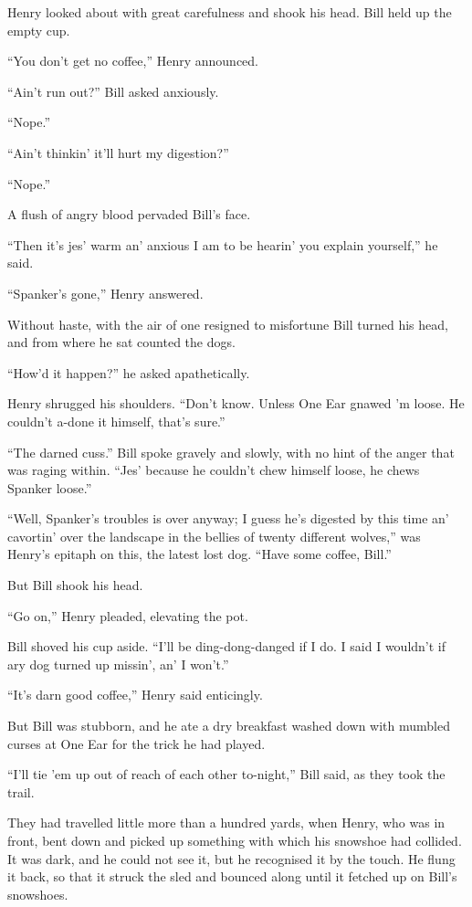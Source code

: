 \documentclass[10pt]{book}
\begin{document}
Henry looked about with great carefulness and shook his head. Bill held
up the empty cup.

“You don’t get no coffee,” Henry announced.

“Ain’t run out?” Bill asked anxiously.

“Nope.”

“Ain’t thinkin’ it’ll hurt my digestion?”

“Nope.”

A flush of angry blood pervaded Bill’s face.

“Then it’s jes’ warm an’ anxious I am to be hearin’ you explain
yourself,” he said.

“Spanker’s gone,” Henry answered.

Without haste, with the air of one resigned to misfortune Bill turned
his head, and from where he sat counted the dogs.

“How’d it happen?” he asked apathetically.

Henry shrugged his shoulders. “Don’t know. Unless One Ear gnawed ’m
loose. He couldn’t a-done it himself, that’s sure.”

“The darned cuss.” Bill spoke gravely and slowly, with no hint of the
anger that was raging within. “Jes’ because he couldn’t chew himself
loose, he chews Spanker loose.”

“Well, Spanker’s troubles is over anyway; I guess he’s digested by this
time an’ cavortin’ over the landscape in the bellies of twenty
different wolves,” was Henry’s epitaph on this, the latest lost dog.
“Have some coffee, Bill.”

But Bill shook his head.

“Go on,” Henry pleaded, elevating the pot.

Bill shoved his cup aside. “I’ll be ding-dong-danged if I do. I said I
wouldn’t if ary dog turned up missin’, an’ I won’t.”

“It’s darn good coffee,” Henry said enticingly.

But Bill was stubborn, and he ate a dry breakfast washed down with
mumbled curses at One Ear for the trick he had played.

“I’ll tie ’em up out of reach of each other to-night,” Bill said, as
they took the trail.

They had travelled little more than a hundred yards, when Henry, who
was in front, bent down and picked up something with which his snowshoe
had collided. It was dark, and he could not see it, but he recognised
it by the touch. He flung it back, so that it struck the sled and
bounced along until it fetched up on Bill’s snowshoes.
\end{document}
